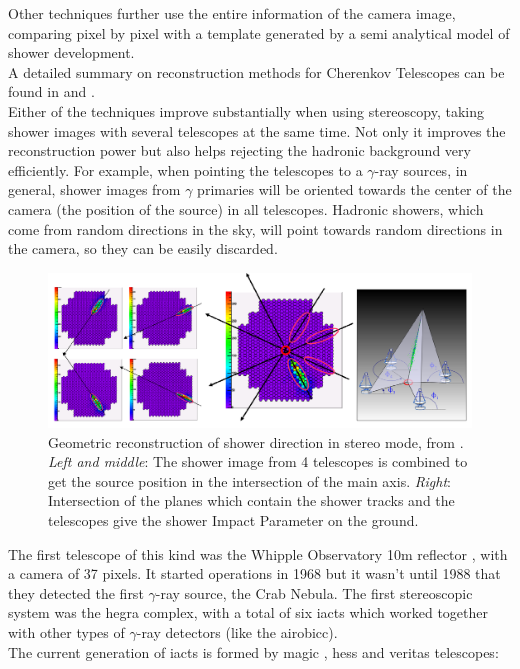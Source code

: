 \documentclass[main.tex]{subfiles}
\begin{document}
Other techniques further use the entire information of the camera image, comparing pixel by pixel with a template generated by a semi analytical model of shower development.\\
A detailed summary on reconstruction methods for Cherenkov Telescopes can be found in \cite{2006analysismethodscherenkovtels} and \cite{2015groundbasedtechniques}.\\

Either of the techniques improve substantially when using stereoscopy, taking shower images with several telescopes at the same time. Not only it improves the reconstruction power but also helps rejecting the hadronic background very efficiently. For example, when pointing the telescopes to a $\gamma$-ray sources, in general, shower images from $\gamma$ primaries will be oriented towards the center of the camera (the position of the source) in all telescopes. Hadronic showers, which come from random directions in the sky, will point towards random directions in the camera, so they can be easily discarded. 

\begin{figure}
    \centering
    \includegraphics[width=1\textwidth]{Pictures/stereomode.pdf}
    \caption{Geometric reconstruction of shower direction in stereo mode, from \cite{2015groundbasedtechniques}. \textit{Left and middle}: The shower image from 4 telescopes is combined to get the source position in the intersection of the main axis. \textit{Right}: Intersection of the planes which contain the shower tracks and the telescopes give the shower Impact Parameter on the ground.}
    \label{fig:stereoreco}
\end{figure}

The first telescope of this kind was the Whipple Observatory 10m reflector \cite{whipple}, with a camera of 37 pixels. It started operations in 1968 but it wasn't until 1988 that they detected the first $\gamma$-ray source, the Crab Nebula. The first stereoscopic system was the \gls{hegra} complex, with a total of six \glspl{iact} which worked together with other types of $\gamma$-ray detectors (like the \gls{airobicc}).\\
The current generation of \glspl{iact} is formed by \gls{magic} \cite{2011magic}, \gls{hess} \cite{2018HESS} and \gls{veritas} \cite{2019VERITAS} telescopes:\\
\end{document}

